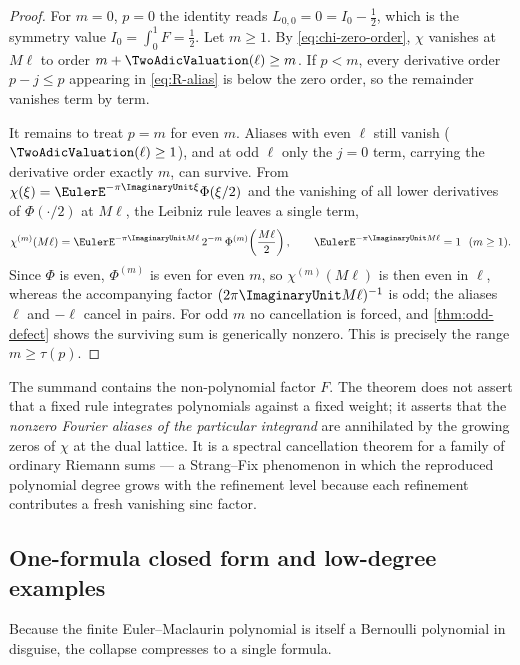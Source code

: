 \begin{proof}
For $m=0$, $p=0$ the identity reads $L_{0,0}=0=I_0-\tfrac12$, which is
the symmetry value $I_0=\int_0^1F=\tfrac12$.  Let $m\ge1$.  By
\eqref{eq:chi-zero-order}, $\chi$ vanishes at $M\ell$ to order
$m+\TwoAdicValuation(\ell)\ge m$.  If $p<m$, every derivative order $p-j\le p$
appearing in \eqref{eq:R-alias} is below the zero order, so the
remainder vanishes term by term.

It remains to treat $p=m$ for even $m$.  Aliases with even $\ell$
still vanish ($\TwoAdicValuation(\ell)\ge1$), and at odd $\ell$ only the $j=0$
term, carrying the derivative order exactly $m$, can survive.  From
$\chi(\xi)=\EulerE^{-\pi\ImaginaryUnit\xi}\Phi(\xi/2)$ and the vanishing of all lower
derivatives of $\Phi(\cdot/2)$ at $M\ell$, the Leibniz rule leaves a
single term,
\[
 \chi^{(m)}(M\ell)
 =\EulerE^{-\pi\ImaginaryUnit M\ell}\,2^{-m}\,
 \Phi^{(m)}\!\left(\frac{M\ell}{2}\right),
 \qquad
 \EulerE^{-\pi\ImaginaryUnit M\ell}=1\ \ (m\ge1).
\]
Since $\Phi$ is even, $\Phi^{(m)}$ is even for even $m$, so
$\chi^{(m)}(M\ell)$ is then even in $\ell$, whereas the accompanying
factor $(2\pi\ImaginaryUnit M\ell)^{-1}$ is odd; the aliases $\ell$ and $-\ell$
cancel in pairs.  For odd $m$ no cancellation is forced, and
\cref{thm:odd-defect} shows the surviving sum is generically nonzero.
This is precisely the range $m\ge\tau(p)$.
\end{proof}

\begin{remark}
The summand contains the non-polynomial factor $F$.  The theorem does
not assert that a fixed rule integrates polynomials against a fixed
weight; it asserts that the \emph{nonzero Fourier aliases of the
particular integrand} are annihilated by the growing zeros of $\chi$
at the dual lattice.  It is a spectral cancellation theorem for a
family of ordinary Riemann sums --- a Strang--Fix phenomenon
\cite{StrangFix,deBoorRon} in which the reproduced polynomial degree
grows with the refinement level because each refinement contributes a
fresh vanishing sinc factor.
\end{remark}

\subsection{One-formula closed form and low-degree examples}

Because the finite Euler--Maclaurin polynomial is itself a Bernoulli
polynomial in disguise, the collapse compresses to a single formula.

